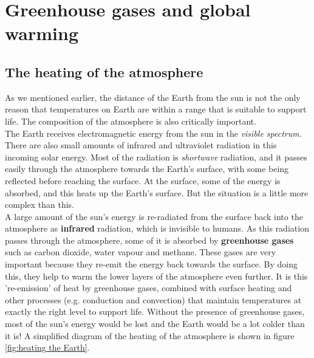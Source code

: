 \section{Greenhouse gases and global warming}
\label{sec:atmosphere:greenhouse}

\subsection{The heating of the atmosphere}

As we mentioned earlier, the distance of the Earth from the sun is not the only reason that temperatures on Earth are within a range that is suitable to support life. The composition of the atmosphere is also critically important. \\

The Earth receives electromagnetic energy from the sun in the \textit{visible spectrum}. There are also small amounts of infrared and ultraviolet radiation in this incoming solar energy. Most of the radiation is \textit{shortwave} radiation, and it passes easily through the atmosphere towards the Earth's surface, with some being reflected before reaching the surface. At the surface, some of the energy is absorbed, and this heats up the Earth's surface. But the situation is a little more complex than this. \\

A large amount of the sun's energy is re-radiated from the surface back into the atmosphere as \textbf{infrared} radiation, which is invisible to humans. As this radiation passes through the atmosphere, some of it is absorbed by \textbf{greenhouse gases} such as carbon dioxide, water vapour and methane. These gases are very important because they re-emit the energy back towards the surface. By doing this, they help to warm the lower layers of the atmosphere even further. It is this 're-emission' of heat by greenhouse gases, combined with surface heating and other processes (e.g. conduction and convection) that maintain temperatures at exactly the right level to support life. Without the presence of greenhouse gases, most of the sun's energy would be lost and the Earth would be a lot colder than it is! A simplified diagram of the heating of the atmosphere is shown in figure \ref{fig:heating the Earth}.


